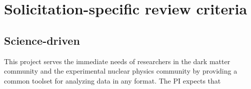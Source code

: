 



\section{Solicitation-specific review criteria}
\subsection{Science-driven}

This project serves the immediate needs of researchers in the dark matter community and the experimental nuclear physics community by providing a common toolset for analyzing data in any format.  The PI expects that

